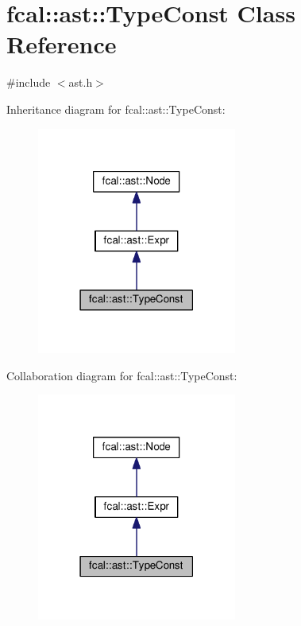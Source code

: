 \hypertarget{classfcal_1_1ast_1_1TypeConst}{}\section{fcal\+:\+:ast\+:\+:Type\+Const Class Reference}
\label{classfcal_1_1ast_1_1TypeConst}


{\ttfamily \#include $<$ast.\+h$>$}



Inheritance diagram for fcal\+:\+:ast\+:\+:Type\+Const\+:\nopagebreak
\begin{figure}[H]
\begin{center}
\leavevmode
\includegraphics[width=186pt]{classfcal_1_1ast_1_1TypeConst__inherit__graph}
\end{center}
\end{figure}


Collaboration diagram for fcal\+:\+:ast\+:\+:Type\+Const\+:\nopagebreak
\begin{figure}[H]
\begin{center}
\leavevmode
\includegraphics[width=186pt]{classfcal_1_1ast_1_1TypeConst__coll__graph}
\end{center}
\end{figure}
